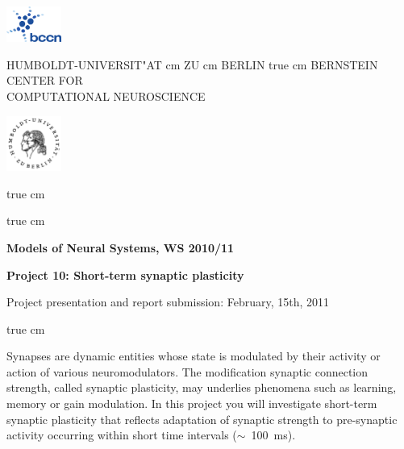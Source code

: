 \documentclass[12pt]{article}
\begin{document}
\parbox{2cm}{
\includegraphics[width=1.8cm]{../bccnlogo.pdf}
}
\parbox{11cm}{
\begin{center}
\large HUMBOLDT-UNIVERSIT"AT  cm ZU  cm BERLIN
 true cm
\mgross BERNSTEIN CENTER FOR\\ COMPUTATIONAL NEUROSCIENCE
\end{center}
}
\parbox{2cm}
{
\hfill
\includegraphics[width=1.8cm]{../hublogo.pdf}
}

 true cm



 true cm
\centerline{\bf Models of Neural Systems, WS 2010/11}
\centerline{\bf Project 10: Short-term synaptic plasticity} 
\centerline{Project presentation and report submission: February,
15th, 2011}

 true cm

Synapses are dynamic entities whose state is modulated by their
activity or action of various neuromodulators. The modification
synaptic connection strength, called synaptic plasticity, may
underlies phenomena such as learning, memory or gain modulation. In
this project you will investigate short-term synaptic plasticity that
reflects adaptation of synaptic strength to pre-synaptic activity 
occurring within short time intervals ($\sim$~100~ms).
\end{document}
